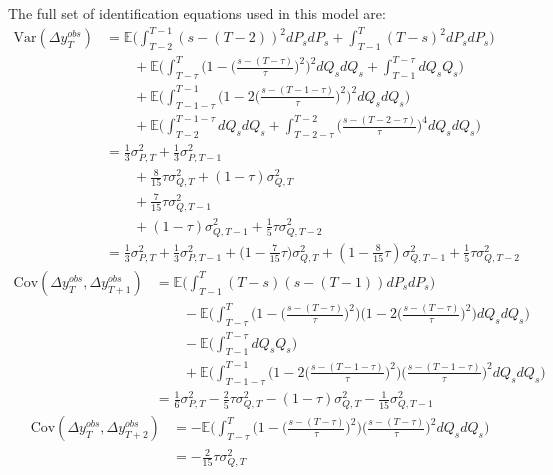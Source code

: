 The full set of identification equations used in this model are:
\begin{align}
\mathrm{Var}(\Delta y^{obs}_T) &= \mathbb{E} \Big(\int_{T-2}^{T-1} (s-(T-2))^2 dP_s dP_s  + \int_{T-1}^{T} (T-s)^2 dP_s dP_s \Big) \nonumber \\
& \qquad + \mathbb{E} \Big(\int_{T-\tau}^{T}\Big( 1 - \Big(\frac{s-(T-\tau)}{\tau}\Big)^2\Big)^2 dQ_s dQ_s +\int_{T-1}^{T-\tau}  dQ_s Q_s\Big) \nonumber \\
& \qquad + \mathbb{E} \Big(  \int_{T-1-\tau}^{T-1} \Big(1 - 2\Big(\frac{s-(T-1-\tau)}{\tau}\Big)^2 \Big)^2 dQ_s dQ_s \Big) \nonumber \\
& \qquad + \mathbb{E} \Big( \int_{T-2}^{T-1-\tau}  dQ_s dQ_s  +\int_{T-2-\tau}^{T-2} \Big(\frac{s-(T-2-\tau)}{\tau}\Big)^4 dQ_s dQ_s  \Big) \nonumber \\
&= \frac{1}{3}\sigma^2_{P,T} + \frac{1}{3}\sigma^2_{P,T-1} \nonumber \\
& \qquad + \frac{8}{15} \tau \sigma^2_{Q,T} + (1-\tau) \sigma^2_{Q,T} \nonumber \\
& \qquad + \frac{7}{15} \tau\sigma^2_{Q,T-1} \nonumber \\
& \qquad +(1-\tau) \sigma^2_{Q,T-1} + \frac{1}{5} \tau\sigma^2_{Q,T-2} \nonumber \\
&= \frac{1}{3}\sigma^2_{P,T} + \frac{1}{3}\sigma^2_{P,T-1} + \big(1-\frac{7}{15}\tau\big) \sigma^2_{Q,T}   +(1-\frac{8}{15}\tau) \sigma^2_{Q,T-1} + \frac{1}{5} \tau\sigma^2_{Q,T-2}
\end{align}
\begin{align}
\mathrm{Cov}(\Delta y^{obs}_T, \Delta y^{obs}_{T+1}) &=  \mathbb{E} \Big(\int_{T-1}^{T} (T-s)(s-(T-1)) dP_s dP_s  \Big) \nonumber \\
&  \qquad -\mathbb{E} \Big(\int_{T-\tau}^{T}\Big( 1 - \Big(\frac{s-(T-\tau)}{\tau}\Big)^2\Big) \Big( 1 - 2\Big(\frac{s-(T-\tau)}{\tau}\Big)^2\Big)  dQ_s dQ_s\Big) \nonumber\\
& \qquad -\mathbb{E} \Big( \int_{T-1}^{T-\tau}  dQ_s Q_s\Big) \nonumber \\
& \qquad +\mathbb{E} \Big( \int_{T-1-\tau}^{T-1}\Big( 1 - 2\Big(\frac{s-(T-1-\tau)}{\tau}\Big)^2\Big)  \Big(\frac{s-(T-1-\tau)}{\tau}\Big)^2 dQ_s dQ_s\Big) \nonumber \\
&= \frac{1}{6}\sigma^2_{P,T}  -\frac{2}{5}\tau \sigma^2_{Q,T}  -(1-\tau) \sigma^2_{Q,T}  -\frac{1}{15} \sigma^2_{Q,T-1} \nonumber 
\end{align}
\begin{align}
\mathrm{Cov}(\Delta y^{obs}_T, \Delta y^{obs}_{T+2}) &=  -\mathbb{E} \Big(\int_{T-\tau}^{T} \Big( 1 - \Big(\frac{s-(T-\tau)}{\tau}\Big)^2\Big) \Big(\frac{s-(T-\tau)}{\tau}\Big)^2 dQ_s dQ_s  \Big) \nonumber \\
&= -\frac{2}{15}\tau \sigma^2_{Q,T}
\end{align}
